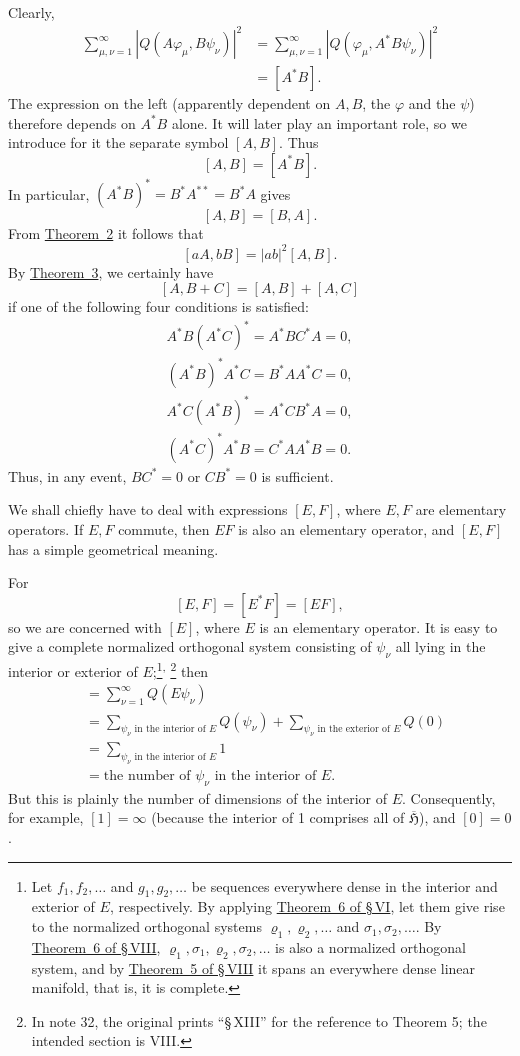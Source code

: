 \documentclass[fontsize=13pt,paper=b5,twoside,bookmarkpackage=false]{scrartcl}
\newcounter{translatornote}
\newcommand{\tnote}[1]{%
  \begingroup\stepcounter{translatornote}%
  \renewcommand{\thefootnote}{T\arabic{translatornote}}%
  \footnote[0]{#1}\endgroup}
\newcommand{\tnoteafter}[1]{\textsuperscript{,}\tnote{#1}}
\begin{document}
Clearly,
\begin{align*}
 \sum_{\mu,\nu=1}^{\infty}|Q(A\varphi_\mu,B\psi_\nu)|^2
 &=\sum_{\mu,\nu=1}^{\infty}|Q(\varphi_\mu,A^*B\psi_\nu)|^2\\
 &=[A^*B].
\end{align*}
The expression on the left (apparently dependent on $A,B$, the $\varphi$ and the $\psi$) therefore depends on $A^*B$ alone. It will later play an important role, so we introduce for it the separate symbol $[A,B]$. Thus
\label{eq:XI:pair-bracket}
\[
 [A,B]=[A^*B].
\]
In particular, $(A^*B)^*=B^*A^{**}=B^*A$ gives
\label{eq:XI:pair-symmetry}
\[
 [A,B]=[B,A].
\]
From \hyperref[thm:XI:2]{Theorem~2} it follows that
\[
 [aA,bB]=|ab|^2[A,B].
\]
By \hyperref[thm:XI:3]{Theorem~3}, we certainly have
\[
 [A,B+C]=[A,B]+[A,C]
\]
if one of the following four conditions is satisfied:
\begin{gather*}
 A^*B(A^*C)^*=A^*BC^*A=0,\\
 (A^*B)^*A^*C=B^*AA^*C=0,\\
 A^*C(A^*B)^*=A^*CB^*A=0,\\
 (A^*C)^*A^*B=C^*AA^*B=0.
\end{gather*}
Thus, in any event, $BC^*=0$ or $CB^*=0$ is sufficient.

We shall chiefly have to deal with expressions $[E,F]$, where $E,F$ are elementary operators. If $E,F$ commute, then $EF$ is also an elementary operator, and $[E,F]$ has a simple geometrical meaning.

For
\[
 [E,F]=[E^*F]=[EF],
\]
so we are concerned with $[E]$, where $E$ is an elementary operator. It is easy to give a complete normalized orthogonal system consisting of $\psi_\nu$ all lying in the interior or exterior of $E$;\footnote[32]{\label{fn:32}Let $f_1,f_2,\ldots$ and $g_1,g_2,\ldots$ be sequences everywhere dense in the interior and exterior of $E$, respectively. By applying \hyperref[thm:VI:6]{Theorem~6 of \S\,VI}, let them give rise to the normalized orthogonal systems $\varrho_1,\varrho_2,\ldots$ and $\sigma_1,\sigma_2,\ldots$. By \hyperref[thm:VIII:6]{Theorem~6 of \S\,VIII}, $\varrho_1,\sigma_1,\varrho_2,\sigma_2,\ldots$ is also a normalized orthogonal system, and by \hyperref[thm:VIII:5]{Theorem~5 of \S\,VIII} it spans an everywhere dense linear manifold, that is, it is complete.}\tnoteafter{In note 32, the original prints ``\S\,XIII'' for the reference to Theorem 5; the intended section is VIII.}
then
\label{eq:XI:projection-dimension}
\begin{align*}
 [E]&=\sum_{\nu=1}^{\infty}Q(E\psi_\nu)\\
 &=\sum_{\psi_\nu\text{ in the interior of }E}Q(\psi_\nu)
 +\sum_{\psi_\nu\text{ in the exterior of }E}Q(0)\\
 &=\sum_{\psi_\nu\text{ in the interior of }E}1\\
 &=\text{the number of }\psi_\nu\text{ in the interior of }E.
\end{align*}
But this is plainly the number of dimensions of the interior of $E$. Consequently, for example, $[1]=\infty$ (because the interior of 1 comprises all of $\overline{\mathfrak{H}}$), and $[0]=0$.
\end{document}
